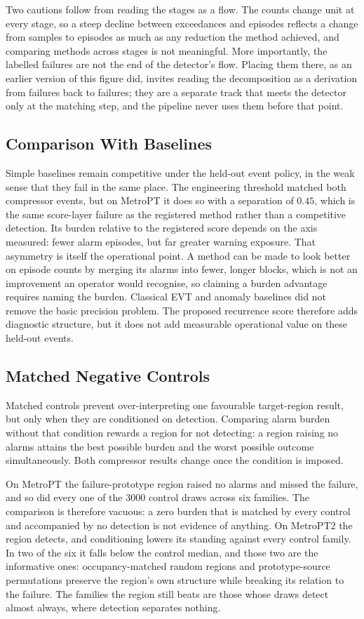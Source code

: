 Two cautions follow from reading the stages as a flow. The counts change unit at every stage, so a steep decline between exceedances and episodes reflects a change from samples to episodes as much as any reduction the method achieved, and comparing methods across stages is not meaningful. More importantly, the labelled failures are not the end of the detector's flow. Placing them there, as an earlier version of this figure did, invites reading the decomposition as a derivation from failures back to failures; they are a separate track that meets the detector only at the matching step, and the pipeline never uses them before that point.

\subsection{Comparison With Baselines}

Simple baselines remain competitive under the held-out event policy, in the weak sense that they fail in the same place. The engineering threshold matched both compressor events, but on MetroPT it does so with a separation of \(0.45\), which is the same score-layer failure as the registered method rather than a competitive detection. Its burden relative to the registered score depends on the axis measured: fewer alarm episodes, but far greater warning exposure. That asymmetry is itself the operational point. A method can be made to look better on episode counts by merging its alarms into fewer, longer blocks, which is not an improvement an operator would recognise, so claiming a burden advantage requires naming the burden. Classical EVT and anomaly baselines did not remove the basic precision problem. The proposed recurrence score therefore adds diagnostic structure, but it does not add measurable operational value on these held-out events.

\subsection{Matched Negative Controls}

Matched controls prevent over-interpreting one favourable target-region result, but only when they are conditioned on detection. Comparing alarm burden without that condition rewards a region for not detecting: a region raising no alarms attains the best possible burden and the worst possible outcome simultaneously. Both compressor results change once the condition is imposed.

On MetroPT the failure-prototype region raised no alarms and missed the failure, and so did every one of the 3000 control draws across six families. The comparison is therefore vacuous: a zero burden that is matched by every control and accompanied by no detection is not evidence of anything. On MetroPT2 the region detects, and conditioning lowers its standing against every control family. In two of the six it falls below the control median, and those two are the informative ones: occupancy-matched random regions and prototype-source permutations preserve the region's own structure while breaking its relation to the failure. The families the region still beats are those whose draws detect almost always, where detection separates nothing.

